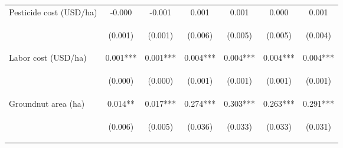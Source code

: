 \begin{center}
\begin{tabular}{lcccccc}
Pesticide cost (USD/ha) & -0.000 & -0.001 & 0.001 & 0.001 & 0.000 & 0.001 \\
\vspace{4pt} & \begin{footnotesize}(0.001)\end{footnotesize} & \begin{footnotesize}(0.001)\end{footnotesize} & \begin{footnotesize}(0.006)\end{footnotesize} & \begin{footnotesize}(0.005)\end{footnotesize} & \begin{footnotesize}(0.005)\end{footnotesize} & \begin{footnotesize}(0.004)\end{footnotesize} \\
Labor cost (USD/ha) & 0.001*** & 0.001*** & 0.004*** & 0.004*** & 0.004*** & 0.004*** \\
\vspace{4pt} & \begin{footnotesize}(0.000)\end{footnotesize} & \begin{footnotesize}(0.000)\end{footnotesize} & \begin{footnotesize}(0.001)\end{footnotesize} & \begin{footnotesize}(0.001)\end{footnotesize} & \begin{footnotesize}(0.001)\end{footnotesize} & \begin{footnotesize}(0.001)\end{footnotesize} \\
Groundnut area (ha) & 0.014** & 0.017*** & 0.274*** & 0.303*** & 0.263*** & 0.291*** \\
\vspace{4pt} & \begin{footnotesize}(0.006)\end{footnotesize} & \begin{footnotesize}(0.005)\end{footnotesize} & \begin{footnotesize}(0.036)\end{footnotesize} & \begin{footnotesize}(0.033)\end{footnotesize} & \begin{footnotesize}(0.033)\end{footnotesize} & \begin{footnotesize}(0.031)\end{footnotesize} \\

\end{tabular}
\end{center}
